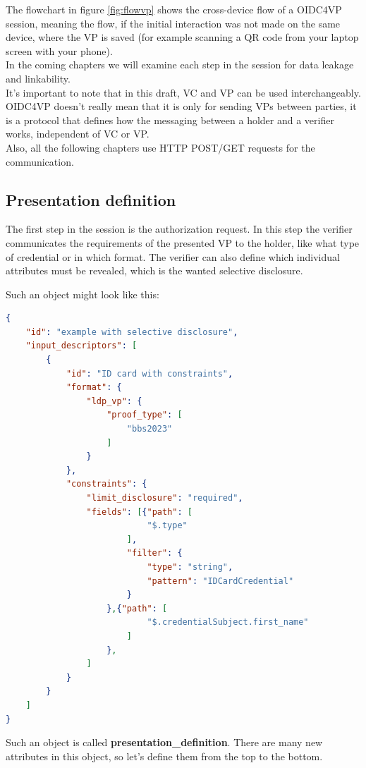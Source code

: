 \documentclass[
	a4paper               %
	,BCOR=0mm            %
	,bibliography=totoc   %
	,listof=totoc         %
	,monolingual
	,twoside=false
]{bfhthesis}              %
\begin{document}
The flowchart in figure \ref{fig:flowvp} shows the cross-device flow of a OIDC4VP session, meaning the flow, if the initial interaction was not made on the same device, where the VP is saved (for example scanning a QR code from your laptop screen with your phone).\\

In the coming chapters we will examine each step in the session for data leakage and linkability.\\

It's important to note that in this draft, VC and VP can be used interchangeably.
OIDC4VP doesn't really mean that it is only for sending VPs between parties, it is a protocol that defines how the messaging between a holder and a verifier works, independent of VC or VP.\\

\noindent
Also, all the following chapters use HTTP POST/GET requests for the communication.

\subsection{Presentation definition}
\label{subsec:presdef}
The first step in the session is the authorization request. 
In this step the verifier communicates the requirements of the presented VP to the holder, like what type of credential or in which format.
The verifier can also define which individual attributes must be revealed, which is the wanted selective disclosure.

Such an object might look like this:
\begin{lstlisting}[language=json,firstnumber=1,caption={Example of a presentation definition},captionpos=b, label={list:presdef}]
{
	"id": "example with selective disclosure",
	"input_descriptors": [
		{
			"id": "ID card with constraints",
			"format": {
				"ldp_vp": {
					"proof_type": [
						"bbs2023"
					]
				}
			},
			"constraints": {
				"limit_disclosure": "required",
				"fields": [{"path": [
							"$.type"
						],
						"filter": {
							"type": "string",
							"pattern": "IDCardCredential"
						}
					},{"path": [
							"$.credentialSubject.first_name"
						]
					},
				]
			}
		}
	]
}
\end{lstlisting}

Such an object is called \textbf{presentation\_definition}.
There are many new attributes in this object, so let's define them from the top to the bottom. \\
\end{document}
